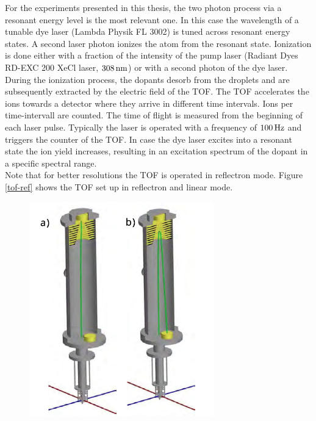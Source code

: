 \documentclass[parskip,12pt,headsepline,a4paper] {scrbook}
\begin{document}
For the experiments presented in this thesis, the two photon process via a resonant energy level is the most relevant one. In this case the wavelength of a tunable dye laser (Lambda Physik FL 3002) is tuned across resonant energy states. A second laser photon ionizes the atom from the resonant state. Ionization is done either with a fraction of the intensity of the pump laser (Radiant Dyes RD-EXC 200 XeCl laser, $\unit[308]{nm}$) or with a second photon of the dye laser. During the ionization process, the dopants desorb from the droplets and are subsequently extracted by the electric field of the TOF. The TOF accelerates the ions towards a detector where they arrive in different time intervals. Ions per time-intervall are counted. The time of flight is measured from the beginning of each laser pulse. Typically the laser is operated with a frequency of $\unit[100]{Hz}$ and triggers the counter of the TOF. In case the dye laser excites into a resonant state the ion yield increases, resulting in an excitation spectrum of the dopant in a specific spectral range. \\
Note that for better resolutions the TOF is operated in reflectron mode. Figure \ref{tof-ref} shows the TOF set up in reflectron and linear mode. \\

\begin{figure}[ht]
\centerline{
\includegraphics[width=8cm]{./measuring_methods/tof-lin-ref.jpg}}
\end{figure}
\end{document}
